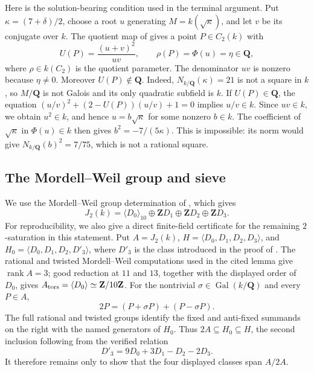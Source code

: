 \documentclass[11pt]{article}
\newcommand{\Q}{\mathbf Q}
\newcommand{\Z}{\mathbf Z}
\newcommand{\rank}{\operatorname{rank}}
\newcommand{\Gal}{\operatorname{Gal}}
\theoremstyle{definition}
\theoremstyle{remark}
\begin{document}
Here is the solution-bearing condition used in the terminal argument.
Put $\kappa=(7+\delta)/2$, choose a root $u$ generating
$M=k(\sqrt\kappa)$, and let $v$ be its conjugate over $k$.
The quotient map of \cite[Lemma~7.2]{DahmenSiksek} gives a point
$P\in C_2(k)$ with
\[
 U(P)=\frac{(u+v)^2}{uv},\qquad \rho(P)=\Phi(u)=\eta\in\Q,
\]
where $\rho\in k(C_2)$ is the quotient parameter.  The denominator
$uv$ is nonzero because $\eta\ne0$.  Moreover $U(P)\notin\Q$.
Indeed, $N_{k/\Q}(\kappa)=21$ is not a square in $k$, so $M/\Q$
is not Galois and its only quadratic subfield is $k$.
If $U(P)\in\Q$, the equation
$(u/v)^2+(2-U(P))(u/v)+1=0$ implies $u/v\in k$.
Since $uv\in k$, we obtain $u^2\in k$, and hence
$u=b\sqrt\kappa$ for some nonzero $b\in k$.
The coefficient of $\sqrt\kappa$ in $\Phi(u)\in k$ then gives
$b^2=-7/(5\kappa)$.  This is impossible: its norm would give
$N_{k/\Q}(b)^2=7/75$, which is not a rational square.

\subsection{The Mordell--Weil group and sieve}

We use the Mordell--Weil group determination of
\cite[Lemma~7.3]{DahmenSiksek}, which gives
\begin{equation}\label{eq:section7-MW}
 J_2(k)=\langle D_0\rangle_{10}
       \oplus\Z D_1\oplus\Z D_2\oplus\Z D_3.
\end{equation}
For reproducibility, we also give a direct finite-field certificate for the
remaining $2$-saturation in this statement.  Put
$A=J_2(k)$, $H=\langle D_0,D_1,D_2,D_3\rangle$, and
$H_0=\langle D_0,D_1,D_2,D'_3\rangle$, where $D'_3$ is the class
introduced in the proof of \cite[Lemma~7.3]{DahmenSiksek}.  The rational and twisted
Mordell--Weil computations used in the cited lemma give
$\rank A=3$; good reduction at $11$ and $13$, together with the displayed
order of $D_0$, gives $A_{\rm tors}=\langle D_0\rangle\simeq\Z/10\Z$.
For the nontrivial $\sigma\in\Gal(k/\Q)$ and every $P\in A$,
\[
                  2P=(P+\sigma P)+(P-\sigma P).
\]
The full rational and twisted groups identify the fixed and anti-fixed
summands on the right with the named generators of $H_0$.
Thus $2A\subseteq H_0\subseteq H$, the second inclusion following from
the verified relation
\[
                 D'_3=9D_0+3D_1-D_2-2D_3.
\]
It therefore remains only to show that the four displayed classes span
$A/2A$.
\end{document}
